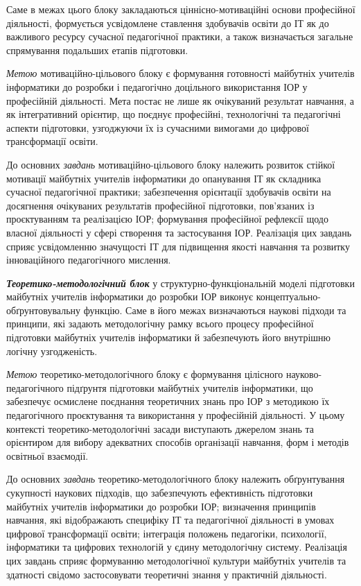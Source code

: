 Саме в межах цього блоку закладаються ціннісно-мотиваційні основи професійної діяльності, формується усвідомлене ставлення здобувачів освіти до ІТ як до важливого ресурсу сучасної педагогічної практики, а також визначається загальне спрямування подальших етапів підготовки.

\emph{Метою} мотиваційно-цільового блоку є формування готовності майбутніх учителів інформатики до розробки і педагогічно доцільного використання ІОР у професійній діяльності. Мета постає не лише як очікуваний результат навчання, а як інтегративний орієнтир, що поєднує професійні, технологічні та педагогічні аспекти підготовки, узгоджуючи їх із сучасними вимогами до цифрової трансформації освіти.

До основних \emph{завдань} мотиваційно-цільового блоку належить розвиток стійкої мотивації майбутніх учителів інформатики до опанування ІТ як складника сучасної педагогічної практики; забезпечення орієнтації здобувачів освіти на досягнення очікуваних результатів професійної підготовки, пов'язаних із проєктуванням та реалізацією ІОР; формування професійної рефлексії щодо власної діяльності у сфері створення та застосування ІОР. Реалізація цих завдань сприяє усвідомленню значущості ІТ для підвищення якості навчання та розвитку інноваційного педагогічного мислення.

\emph{\textbf{Теоретико-методологічний блок}} у структурно-функціональній моделі підготовки майбутніх учителів інформатики до розробки ІОР виконує концептуально-обґрунтовувальну функцію. Саме в його межах визначаються наукові підходи та принципи, які задають методологічну рамку всього процесу професійної підготовки майбутніх учителів інформатики й забезпечують його внутрішню логічну узгодженість.

\emph{Метою} теоретико-методологічного блоку є формування цілісного науково-педагогічного підґрунтя підготовки майбутніх учителів інформатики, що забезпечує осмислене поєднання теоретичних знань про ІОР з методикою їх педагогічного проєктування та використання у професійній діяльності. У цьому контексті теоретико-методологічні засади виступають джерелом знань та орієнтиром для вибору адекватних способів організації навчання, форм і методів освітньої взаємодії.

До основних \emph{завдань} теоретико-методологічного блоку належить обґрунтування сукупності наукових підходів, що забезпечують ефективність підготовки майбутніх учителів інформатики до розробки ІОР; визначення принципів навчання, які відображають специфіку ІТ та педагогічної діяльності в умовах цифрової трансформації освіти; інтеграція положень педагогіки, психології, інформатики та цифрових технологій у єдину методологічну систему. Реалізація цих завдань сприяє формуванню методологічної культури майбутніх учителів та здатності свідомо застосовувати теоретичні знання у практичній діяльності.

